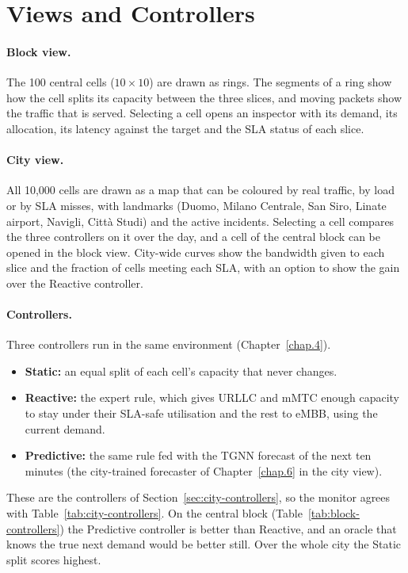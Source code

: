 \section{Views and Controllers}
\label{sec:slice-views}
\paragraph{Block view.} The 100 central cells ($10\times10$) are drawn as rings. The segments of a ring show how the cell splits its capacity between the three slices, and moving packets show the traffic that is served. Selecting a cell opens an inspector with its demand, its allocation, its latency against the target and the SLA status of each slice.

\paragraph{City view.} All 10{,}000 cells are drawn as a map that can be coloured by real traffic, by load or by SLA misses, with landmarks (Duomo, Milano Centrale, San Siro, Linate airport, Navigli, Citt\`a Studi) and the active incidents. Selecting a cell compares the three controllers on it over the day, and a cell of the central block can be opened in the block view. City-wide curves show the bandwidth given to each slice and the fraction of cells meeting each SLA, with an option to show the gain over the Reactive controller.

\paragraph{Controllers.} Three controllers run in the same environment (Chapter~\ref{chap.4}).
\begin{itemize}
	\item \textbf{Static:} an equal split of each cell's capacity that never changes.
	\item \textbf{Reactive:} the expert rule, which gives URLLC and mMTC enough capacity to stay under their SLA-safe utilisation and the rest to eMBB, using the current demand.
	\item \textbf{Predictive:} the same rule fed with the TGNN forecast of the next ten minutes (the city-trained forecaster of Chapter~\ref{chap.6} in the city view).
\end{itemize}
These are the controllers of Section~\ref{sec:city-controllers}, so the monitor agrees with Table~\ref{tab:city-controllers}. On the central block (Table~\ref{tab:block-controllers}) the Predictive controller is better than Reactive, and an oracle that knows the true next demand would be better still. Over the whole city the Static split scores highest.

